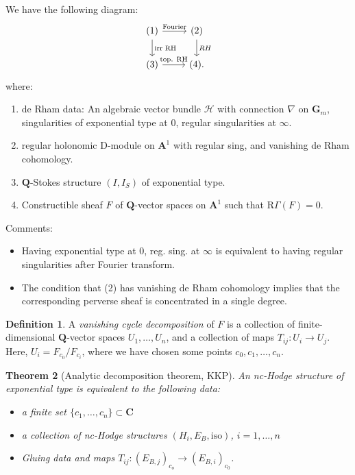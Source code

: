 \documentclass[11pt, reqno]{amsart}
\numberwithin{equation}{section}
\theoremstyle{plain}
\newtheorem{theorem}{Theorem}[section]
\theoremstyle{definition}
\newtheorem{definition}[theorem]{Definition}
\theoremstyle{italicsname}
\newcommand{\cH}{\mathcal{H}}
\newcommand{\rR}{\mathrm{R}}
\newcommand{\bA}{\mathbf{A}}
\newcommand{\bC}{\mathbf{C}}
\newcommand{\bG}{\mathbf{G}}
\newcommand{\bQ}{\mathbf{Q}}
\newcommand{\james}[1]{\leavevmode{\color{magenta}{#1}}}
\newcommand{\todo}[1]{\vspace{5 mm}\par \noindent
\marginpar{\hfill \textsc{ToDo}}
\framebox{\begin{minipage}[c]{0.95 \textwidth}
 #1 \end{minipage}}\vspace{5 mm}\par}
\begin{document}
We have the following diagram:
\[
    \begin{tikzcd}
        (1) \ar[r, "\textrm{Fourier}"] \ar[d, "\textrm{irr RH}"] &  (2) \ar[d, "RH"] \\
        (3) \ar[r, "\textrm{top. RH}"] & (4) .
    \end{tikzcd}
\]
where:
\begin{enumerate} [label = (\arabic*)]
    \item de Rham data: An algebraic vector bundle $\cH$ with connection $\nabla$ on $\bG_m$, singularities of exponential type at $0$, regular singularities at $\infty$.
    \item regular holonomic D-module on $\bA^1$ with regular sing, and vanishing de Rham cohomology.
    \item $\bQ$-Stokes structure $(I, I_S)$ of exponential type.
    \item Constructible sheaf $F$ of $\bQ$-vector spaces on $\bA^1$ such that $\rR \Gamma(F) = 0$.
\end{enumerate}
Comments:
\begin{itemize}
    \item Having exponential type at $0$, reg. sing. at $\infty$ is equivalent to having regular singularities after Fourier transform.
    \item The condition that (2) has vanishing de Rham cohomology implies that the corresponding perverse sheaf is concentrated in a single degree.
\end{itemize}

\begin{definition}
\label{def:vanishing_cycle_decomposition}
    A \emph{vanishing cycle decomposition} of $F$ is a collection of finite-dimensional $\bQ$-vector spaces $U_1, \dots, U_n$, and a collection of maps $T_{i j}:U_i \to U_j$. Here, $U_i = F_{c_0}/F_{c_i}$, where we have chosen some points $c_0, c_1, \dots, c_n$.
\end{definition}



\todo{\james{Incomplete. This is supposed to be the generalization of the classical picture of a perverse sheaf on a disc.}}

\begin{theorem}[Analytic decomposition theorem, KKP]
\label{thm:analytic_decomposition_theorem}
    An nc-Hodge structure of exponential type is equivalent to the following data:
    \begin{itemize}
        \item a finite set $\{c_1, \dots, c_n\} \subset \bC$
        \item a collection of nc-Hodge structures $(H_i, E_B, \mathrm{iso})$, $i = 1, \dots, n$
        \item Gluing data and maps $T_{ij}: (E_{B, j})_{c_o} \to (E_{B, i})_{c_0}$.
    \end{itemize}
\end{theorem}
\end{document}
